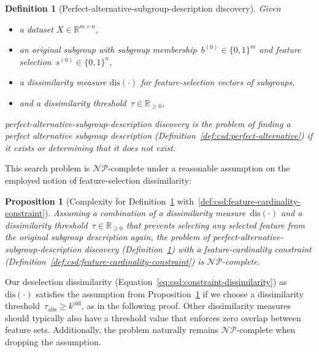 \documentclass[acmsmall]{acmart} %
\theoremstyle{acmplain}
\newtheorem{proposition}{Proposition}
\theoremstyle{acmdefinition}
\newtheorem{definition}{Definition}
\begin{document}
\begin{definition}[Perfect-alternative-subgroup-description discovery]
	Given
	\begin{itemize}[noitemsep]
		\item a dataset $X \in \mathbb{R}^{m \times n}$,
		\item an original subgroup with subgroup membership~$b^{(0)} \in \{0, 1\}^m$ and feature selection~$s^{(0)} \in \{0, 1\}^n$,
		\item a dissimilarity measure $\text{dis}(\cdot)$ for feature-selection vectors of subgroups,
		\item and a dissimilarity threshold~$\tau \in \mathbb{R}_{\geq 0}$,
	\end{itemize}
	\emph{perfect-alternative-subgroup-description discovery} is the problem of finding a perfect alternative subgroup description (Definition~\ref{def:csd:perfect-alternative}) if it exists or determining that it does not exist.
	\label{def:csd:perfect-alternative-subgroup-description-discovery}
\end{definition}
%
This search problem is $\mathcal{NP}$-complete under a reasonable assumption on the employed notion of feature-selection dissimilarity:
%
\begin{proposition}[Complexity for Definition~\ref{def:csd:perfect-alternative-subgroup-description-discovery} with~\ref{def:csd:feature-cardinality-constraint}]
	Assuming a combination of a dissimilarity measure~$\text{dis}(\cdot)$ and a dissimilarity threshold~$\tau \in \mathbb{R}_{\geq 0}$ that prevents selecting any selected feature from the original subgroup description again,
	the problem of perfect-alternative-subgroup-description discovery (Definition~\ref{def:csd:perfect-alternative-subgroup-description-discovery}) with a feature-cardinality constraint (Definition~\ref{def:csd:feature-cardinality-constraint}) is $\mathcal{NP}$-complete.
	\label{prop:csd:complexity-perfect-alternatives-np-perfect-subgroup}
\end{proposition}
%
Our deselection dissimilarity (Equation~\ref{eq:csd:constraint-dissimilarity}) as~$\text{dis}(\cdot)$ satisfies the assumption from Proposition~\ref{prop:csd:complexity-perfect-alternatives-np-perfect-subgroup} if we choose a dissimilarity threshold~$\tau_{\text{abs}} \geq k^{\text{old}}$, as in the following proof.
Other dissimilarity measures should typically also have a threshold value that enforces zero overlap between feature sets.
Additionally, the problem naturally remains $\mathcal{NP}$-complete when dropping the assumption.
\end{document}
